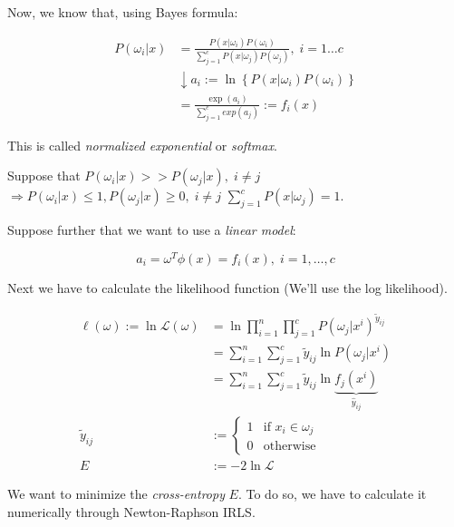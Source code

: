 
Now, we know that, using Bayes formula:

\begin{align*}
  P(\omega_i|x) &= \frac{P(x|\omega_i)P(\omega_i)}{\sum_{j=1}^c P(x|\omega_j)P(\omega_j)}, \; i=1 \dots c \\
                & \downarrow  a_i := \ln \left\{ P(x|\omega_i)P(\omega_i) \right\} \\
                &= \frac{\exp(a_i)}{\sum_{j=1}^c exp(a_j)} := f_i(x)
\end{align*}

This is called \emph{normalized exponential} or \emph{softmax}.

Suppose that $P(\omega_i|x) >> P(\omega_j | x), \; i \neq j$
$\Rightarrow P(\omega_i | x) \leq 1, P(\omega_j | x) \geq 0, \; i \neq j$
$\sum_{j=1}^c P(x|\omega_j) = 1$.

Suppose further that we want to use a \emph{linear model}:

\begin{equation*}
  a_i = \omega^T \phi(x) = f_i(x), \; i = 1, \dots, c
\end{equation*}

%

Next we have to calculate the likelihood function (We'll use the log likelihood).

\begin{align*}
  \ell(\omega) := \ln\mathcal{L}(\omega) &= \ln
  \prod_{i=1}^n \prod_{j=1}^c P\left(\omega_j|x^i\right)^{\tilde{y}_{ij}} \\
  &= \sum_{i=1}^n \sum_{j=1}^c \tilde{y}_{ij} \ln P(\omega_j | x^i) \\
  &= \sum_{i=1}^n \sum_{j=1}^c \tilde{y}_{ij} \ln \underbrace{f_j(x^i)}_{\hat{y}_{ij}} \\[1em]
  \tilde{y}_{ij} &:= \begin{cases}
    1 & \text{if } x_i \in \omega_j \\
    0 & \text{otherwise}
  \end{cases} \\
    E &:= -2\ln \mathcal{L} \tag{Error function / cross-entropy}
\end{align*}

We want to minimize the \emph{cross-entropy} $E$. To do so, we have to
calculate it numerically through Newton-Raphson \textrightarrow{} IRLS.

